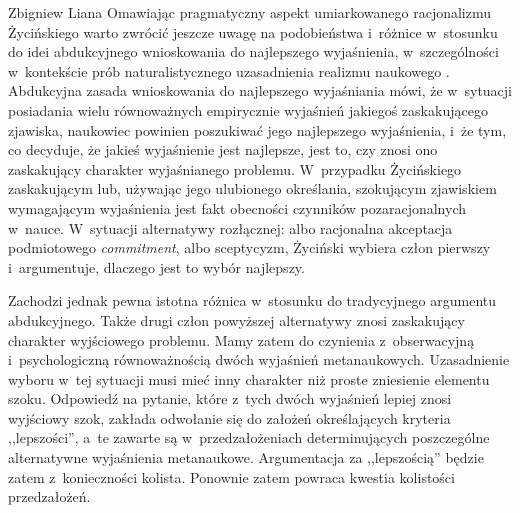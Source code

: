 \begin{artplenv}{Zbigniew Liana}
Omawiając pragmatyczny aspekt umiarkowanego racjonalizmu Życińskiego warto zwrócić jeszcze uwagę na podobieństwa i~różnice w~stosunku do idei abdukcyjnego wnioskowania do najlepszego wyjaśnienia, w~szczególności w~kontekście prób naturalistycznego uzasadnienia realizmu naukowego
\parencites[zob.][s.~102n.265]{grobler_metodologia_2006}[][]{liana_naturalistyczne_2003}. %
 Abdukcyjna zasada wnioskowania do najlepszego wyjaśniania mówi, że w~sytuacji posiadania wielu równoważnych empirycznie wyjaśnień jakiegoś zaskakującego zjawiska, naukowiec powinien poszukiwać jego najlepszego wyjaśnienia, i~że tym, co decyduje, że jakieś wyjaśnienie jest najlepsze, jest to, czy znosi ono zaskakujący charakter wyjaśnianego problemu. W~przypadku Życińskiego zaskakującym lub, używając jego ulubionego określania, szokującym zjawiskiem wymagającym wyjaśnienia jest fakt obecności czynników pozaracjonalnych w~nauce. W~sytuacji alternatywy rozłącznej: albo racjonalna akceptacja podmiotowego \textit{commitment}, albo sceptycyzm, Życiński wybiera człon pierwszy i~argumentuje, dlaczego jest to wybór najlepszy.

Zachodzi jednak pewna istotna różnica w~stosunku do tradycyjnego argumentu abdukcyjnego. Także drugi człon powyższej alternatywy znosi zaskakujący charakter wyjściowego problemu. Mamy zatem do czynienia z~obserwacyjną i~psychologiczną równoważnością dwóch wyjaśnień metanaukowych. Uzasadnienie wyboru w~tej sytuacji musi mieć inny charakter niż proste zniesienie elementu szoku. Odpowiedź na pytanie, które z~tych dwóch wyjaśnień lepiej znosi wyjściowy szok, zakłada odwołanie się do założeń określających kryteria ,,lepszości'', a~te zawarte są w~przedzałożeniach determinujących poszczególne alternatywne wyjaśnienia metanaukowe. Argumentacja za ,,lepszością'' będzie zatem z~konieczności kolista. Ponownie zatem powraca kwestia kolistości przedzałożeń.


\end{artplenv}
